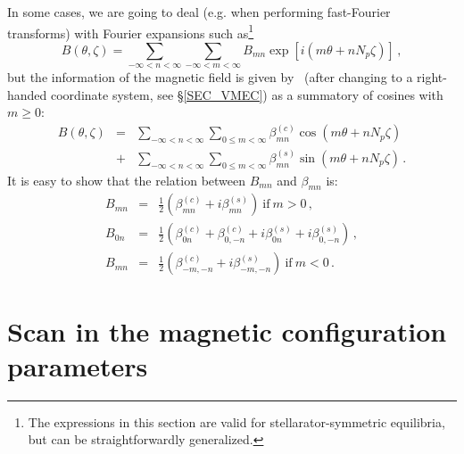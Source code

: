 In some cases, we are going to deal (e.g. when performing fast-Fourier transforms) with Fourier expansions such as\footnote{The expressions in this section are valid for stellarator-symmetric equilibria, but can be straightforwardly generalized.}
\begin{equation}
B(\theta,\zeta) = \sum_{-\infty<n<\infty}\sum_{-\infty<m<\infty} B_{mn}\exp{[i(m\theta+nN_p\zeta)]}\,,
\end{equation}
but the information of the magnetic field is given by \VMEC~(after changing to a right-handed coordinate system, see \S\ref{SEC_VMEC}) as a summatory of cosines with $m\geq 0$:
\begin{eqnarray}
B(\theta,\zeta) &=& \sum_{-\infty<n<\infty}\sum_{0\leq m<\infty} \beta_{mn}^{(c)}\cos{(m\theta+nN_p\zeta)}\nonumber\\
&+& \sum_{-\infty<n<\infty}\sum_{0\leq m<\infty} \beta_{mn}^{(s)}\sin{(m\theta+nN_p\zeta)}\,.
\end{eqnarray}
It is easy to show that the relation between $B_{mn}$ and $\beta_{mn}$ is:
\begin{eqnarray}
B_{mn} &=& \frac{1}{2}(\beta_{mn}^{(c)}+i\beta_{mn}^{(s)})~\mathrm{if}~m>0\,, \nonumber\\
B_{0n} &=& \frac{1}{2}(\beta_{0n}^{(c)}+\beta_{0,-n}^{(c)}+i\beta_{0n}^{(s)}+i\beta_{0,-n}^{(s)})\,, \nonumber\\
B_{mn} &=& \frac{1}{2}(\beta_{-m,-n}^{(c)}+i\beta_{-m,-n}^{(s)})~\mathrm{if}~m<0\,.
\end{eqnarray}



\section{Scan in the magnetic configuration parameters}\label{SEC_SCAN}

